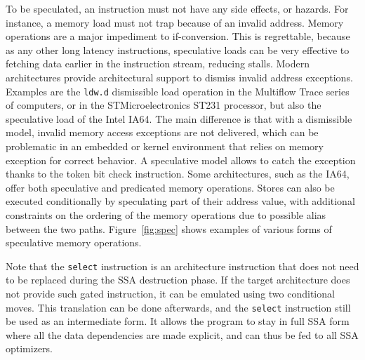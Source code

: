 To be speculated, an instruction must not have any side effects, or hazards. 
For instance, a memory load must not trap because of an invalid address. 
Memory operations are a major impediment to if-conversion. 
This is regrettable, because as any other long latency instructions, speculative loads can be very effective to fetching data earlier in the instruction stream, reducing stalls. 
Modern architectures provide architectural support to dismiss invalid address exceptions. 
Examples are the \texttt{ldw.d} dismissible load operation in the Multiflow Trace series of computers, or in the STMicroelectronics ST231 processor, but also the speculative load of the Intel IA64. 
The main difference is that with a dismissible model, invalid memory access exceptions are not delivered, which can be problematic in an embedded or kernel environment that relies on memory exception for correct behavior. 
A speculative model allows to catch the exception thanks to the token bit check instruction. 
Some architectures, such as the IA64, offer both speculative and predicated memory operations. Stores can also be executed conditionally by speculating part of their address value, with additional constraints on the ordering of the memory operations due to possible alias between the two paths. 
Figure~\ref{fig:spec} shows examples of various forms of speculative memory operations.

Note that the \texttt{select} instruction is an architecture instruction that does not need to be replaced during the SSA destruction phase. 
If the target architecture does not provide such gated instruction, it can be emulated using two conditional moves. 
This translation can be done afterwards, and the \texttt{select} instruction still be used as an intermediate form. 
It allows the program to stay in full SSA form where all the data dependencies are made explicit, and can thus be fed to all SSA optimizers.

